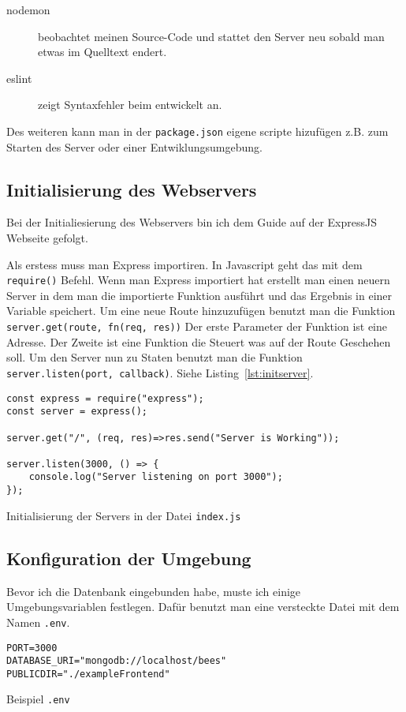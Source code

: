 \documentclass[a4paper, ngerman, 11pt]{scrartcl}
\newcommand{\js}[1]{\texttt{#1}}
\begin{document}
\begin{description}
	\item[nodemon] beobachtet meinen Source-Code und stattet den Server neu sobald man etwas im Quelltext endert.
	\item[eslint] zeigt Syntaxfehler beim entwickelt an.
\end{description}

Des weiteren kann man in der \texttt{package.json} eigene scripte hizufügen z.B. zum Starten des Server oder einer Entwiklungsumgebung.

\subsection{Initialisierung des Webservers} %

Bei der Initialiesierung des Webservers bin ich dem Guide auf der ExpressJS Webseite gefolgt.\autocite{Expressjs}

Als erstess muss man Express importiren. In Javascript geht das mit dem \js{require()} Befehl.
Wenn man Express importiert hat erstellt man einen neuern Server in dem man die importierte Funktion ausführt und das Ergebnis in einer Variable speichert.
Um eine neue Route hinzuzufügen benutzt man die Funktion \js{server.get(route, fn(req, res))}
Der erste Parameter der Funktion ist eine Adresse. Der Zweite ist eine Funktion die Steuert was auf der Route Geschehen soll.
Um den Server nun zu Staten benutzt man die Funktion \js{server.listen(port, callback)}.
Siehe Listing~\ref{lst:initserver}.

\begin{listing}[ht]
\centering
\begin{verbatim}
const express = require("express");
const server = express();

server.get("/", (req, res)=>res.send("Server is Working"));

server.listen(3000, () => {
    console.log("Server listening on port 3000");
});
\end{verbatim}
\caption{Initialisierung der Servers in der Datei \texttt{index.js}\label{lst:initserver}}
\end{listing}


\subsection{Konfiguration der Umgebung} %

Bevor ich die Datenbank eingebunden habe, muste ich einige Umgebungsvariablen festlegen.
Dafür benutzt man eine versteckte Datei mit dem Namen \texttt{.env}.
\begin{listing}[ht]
\centering
\begin{verbatim}
PORT=3000
DATABASE_URI="mongodb://localhost/bees"
PUBLICDIR="./exampleFrontend"
\end{verbatim}
\caption{Beispiel \texttt{.env}}\label{lst:dotenv}
\end{listing}
\end{document}
